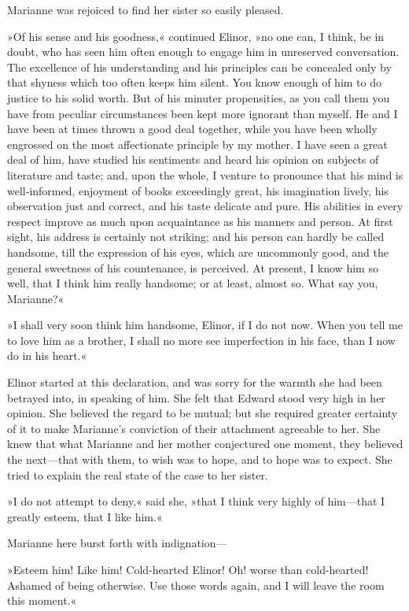 Marianne was rejoiced to find her sister so easily pleased.

»Of his sense and his goodness,« continued Elinor, »no one can, I think, be in doubt, who has seen him often enough to engage him in unreserved conversation. The excellence of his understanding and his principles can be concealed only by that shyness which too often keeps him silent. You know enough of him to do justice to his solid worth. But of his minuter propensities, as you call them you have from peculiar circumstances been kept more ignorant than myself. He and I have been at times thrown a good deal together, while you have been wholly engrossed on the most affectionate principle by my mother. I have seen a great deal of him, have studied his sentiments and heard his opinion on subjects of literature and taste; and, upon the whole, I venture to pronounce that his mind is well-informed, enjoyment of books exceedingly great, his imagination lively, his observation just and correct, and his taste delicate and pure. His abilities in every respect improve as much upon acquaintance as his manners and person. At first sight, his address is certainly not striking; and his person can hardly be called handsome, till the expression of his eyes, which are uncommonly good, and the general sweetness of his countenance, is perceived. At present, I know him so well, that I think him really handsome; or at least, almost so. What say you, Marianne?«

»I shall very soon think him handsome, Elinor, if I do not now. When you tell me to love him as a brother, I shall no more see imperfection in his face, than I now do in his heart.«

Elinor started at this declaration, and was sorry for the warmth she had been betrayed into, in speaking of him. She felt that Edward stood very high in her opinion. She believed the regard to be mutual; but she required greater certainty of it to make Marianne’s conviction of their attachment agreeable to her. She knew that what Marianne and her mother conjectured one moment, they believed the next—that with them, to wish was to hope, and to hope was to expect. She tried to explain the real state of the case to her sister.

»I do not attempt to deny,« said she, »that I think very highly of him—that I greatly esteem, that I like him.«

Marianne here burst forth with indignation—

»Esteem him! Like him! Cold-hearted Elinor! Oh! worse than cold-hearted! Ashamed of being otherwise. Use those words again, and I will leave the room this moment.«

